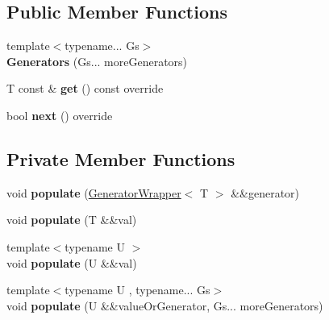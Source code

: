 \subsection*{Public Member Functions}
\begin{DoxyCompactItemize}
\item 
\mbox{\label{classCatch_1_1Generators_1_1Generators_a0288170b30cd0fdfef6efc2d9bc8acba}} 
{\footnotesize template$<$typename... Gs$>$ }\\{\bfseries Generators} (Gs... more\+Generators)
\item 
\mbox{\label{classCatch_1_1Generators_1_1Generators_a66705482b7efa88cae6e6b7062d5de6a}} 
T const  \& {\bfseries get} () const override
\item 
\mbox{\label{classCatch_1_1Generators_1_1Generators_ad127fd2a07347b527f79ab3b78bd40fb}} 
bool {\bfseries next} () override
\end{DoxyCompactItemize}
\subsection*{Private Member Functions}
\begin{DoxyCompactItemize}
\item 
\mbox{\label{classCatch_1_1Generators_1_1Generators_a56e1b82d4c9c952076cd58efbf7a4572}} 
void {\bfseries populate} (\hyperlink{classCatch_1_1Generators_1_1GeneratorWrapper}{Generator\+Wrapper}$<$ T $>$ \&\&generator)
\item 
\mbox{\label{classCatch_1_1Generators_1_1Generators_ad708036fa5a9bf0cd1520ce111bc851d}} 
void {\bfseries populate} (T \&\&val)
\item 
\mbox{\label{classCatch_1_1Generators_1_1Generators_a8ff8b7dda734d1808b644fefc67f4c98}} 
{\footnotesize template$<$typename U $>$ }\\void {\bfseries populate} (U \&\&val)
\item 
\mbox{\label{classCatch_1_1Generators_1_1Generators_a4b9680ee28e48e4dc4c4538b5510e649}} 
{\footnotesize template$<$typename U , typename... Gs$>$ }\\void {\bfseries populate} (U \&\&value\+Or\+Generator, Gs... more\+Generators)
\end{DoxyCompactItemize}
